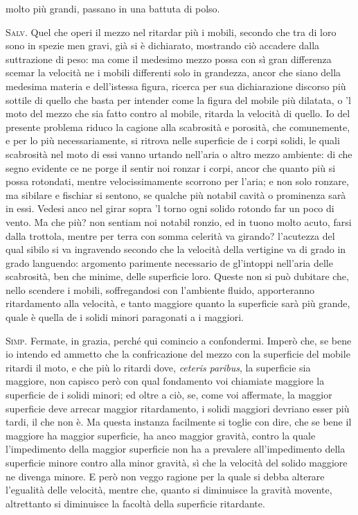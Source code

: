 \documentclass[11pt,twoside,openany]{book}
\newcommand{\speaker}[1]{\textcolor{rubric}{\textsc{#1}}\space}
\begin{document}
molto più grandi, passano in una battuta di polso.

\speaker{Salv.} Quel che operi il mezzo nel ritardar più i mobili, secondo che tra di loro sono in spezie men gravi, già si è dichiarato, mostrando ciò accadere dalla suttrazione di peso: ma come il medesimo mezzo possa con sì gran differenza scemar la velocità ne i mobili differenti solo in grandezza, ancor che siano della medesima materia e dell'istessa figura, ricerca per sua dichiarazione discorso più sottile di quello che basta per intender come la figura del mobile più dilatata, o 'l moto del mezzo che sia fatto contro al mobile, ritarda la velocità di quello. Io del presente problema riduco la cagione alla scabrosità e porosità, che comunemente, e per lo più necessariamente, si ritrova nelle superficie de i corpi solidi, le quali scabrosità nel moto di essi vanno urtando nell'aria o altro mezzo ambiente: di che segno evidente ce ne porge il sentir noi ronzar i corpi, ancor che quanto più si possa rotondati, mentre velocissimamente scorrono per l'aria; e non solo ronzare, ma sibilare e fischiar si sentono, se qualche più notabil cavità o prominenza sarà in essi. Vedesi anco nel girar sopra 'l torno ogni solido rotondo far un poco di vento. Ma che più? non sentiam noi notabil ronzio, ed in tuono molto acuto, farsi dalla trottola, mentre per terra con somma celerità va girando? l'acutezza del qual sibilo si va ingravendo secondo che la velocità della vertigine va di grado in grado languendo: argomento parimente necessario de gl'intoppi nell'aria delle scabrosità, ben che minime, delle superficie loro. Queste non si può dubitare che, nello scendere i mobili, soffregandosi con l'ambiente fluido, apporteranno ritardamento alla velocità, e tanto maggiore quanto la superficie sarà più grande, quale è quella de i solidi minori paragonati a i maggiori.

\speaker{Simp.} Fermate, in grazia, perché qui comincio a confondermi. Imperò che, se bene io intendo ed ammetto che la confricazione del mezzo con la superficie del mobile ritardi il moto, e che più lo ritardi dove, \emph{ceteris} \emph{paribus}, la superficie sia maggiore, non capisco però con qual fondamento voi chiamiate maggiore la superficie de i solidi minori; ed oltre a ciò, se, come voi affermate, la maggior superficie deve arrecar maggior ritardamento, i solidi maggiori devriano esser più tardi, il che non è. Ma questa instanza facilmente si toglie con dire, che se bene il maggiore ha maggior superficie, ha anco maggior gravità, contro la quale l'impedimento della maggior superficie non ha a prevalere all'impedimento della superficie minore contro alla minor gravità, sì che la velocità del solido maggiore ne divenga minore. E però non veggo ragione per la quale si debba alterare l'egualità delle velocità, mentre che, quanto si diminuisce la gravità movente, altrettanto si diminuisce la facoltà della superficie ritardante.
\end{document}
